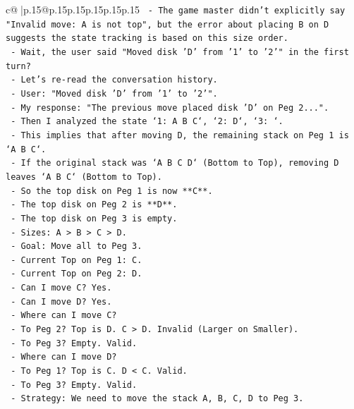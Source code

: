 \documentclass{article}
\begin{document}
{\begin{supertabular}{c@{$\;$}|p{.15\linewidth}@{}p{.15\linewidth}p{.15\linewidth}p{.15\linewidth}p{.15\linewidth}p{.15\linewidth}}
{{{\texttt{          {-} The game master didn't explicitly say "Invalid move: A is not top", but the error about placing B on D suggests the state tracking is based on this size order.} \\
\texttt{          {-} Wait, the user said "Moved disk 'D' from '1' to '2'" in the first turn?} \\
\texttt{          {-} Let's re{-}read the conversation history.} \\
\texttt{          {-} User: "Moved disk 'D' from '1' to '2'".} \\
\texttt{          {-} My response: "The previous move placed disk 'D' on Peg 2...".} \\
\texttt{          {-} Then I analyzed the state `1: A B C`, `2: D`, `3: `.} \\
\texttt{          {-} This implies that after moving D, the remaining stack on Peg 1 is `A B C`.} \\
\texttt{          {-} If the original stack was `A B C D` (Bottom to Top), removing D leaves `A B C` (Bottom to Top).} \\
\texttt{          {-} So the top disk on Peg 1 is now **C**.} \\
\texttt{          {-} The top disk on Peg 2 is **D**.} \\
\texttt{          {-} The top disk on Peg 3 is empty.} \\
\texttt{          {-} Sizes: A > B > C > D.} \\
\texttt{          {-} Goal: Move all to Peg 3.} \\
\texttt{          {-} Current Top on Peg 1: C.} \\
\texttt{          {-} Current Top on Peg 2: D.} \\
\texttt{          {-} Can I move C? Yes.} \\
\texttt{          {-} Can I move D? Yes.} \\
\texttt{          {-} Where can I move C?} \\
\texttt{            {-} To Peg 2? Top is D. C > D. Invalid (Larger on Smaller).} \\
\texttt{            {-} To Peg 3? Empty. Valid.} \\
\texttt{          {-} Where can I move D?} \\
\texttt{            {-} To Peg 1? Top is C. D < C. Valid.} \\
\texttt{            {-} To Peg 3? Empty. Valid.} \\
\texttt{          {-} Strategy: We need to move the stack A, B, C, D to Peg 3.} \\
}}}
\end{supertabular}}
\end{document}
